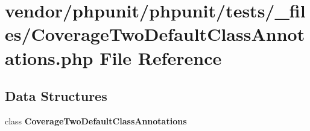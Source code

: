\section{vendor/phpunit/phpunit/tests/\+\_\+files/\+Coverage\+Two\+Default\+Class\+Annotations.php File Reference}
\label{phpunit_2tests_2__files_2_coverage_two_default_class_annotations_8php}
\subsection*{Data Structures}
\begin{DoxyCompactItemize}
\item 
class {\bf Coverage\+Two\+Default\+Class\+Annotations}
\end{DoxyCompactItemize}
